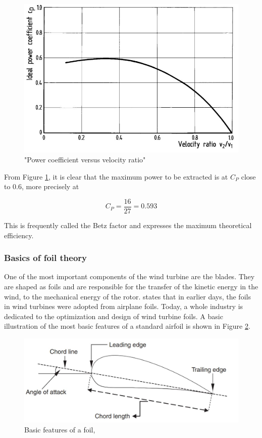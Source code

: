 \begin{figure}[H]
\centering
\includegraphics[scale=0.6]{figures/idealflow}
\caption[$\; \:$Power coefficient versus velocity ratio]{"Power coefficient versus velocity ratio" \cite{Hau2013} }
 \label{fig:idealflow}
\end{figure}

\noindent  From Figure \ref{fig:idealflow}, it is clear that the maximum power to be extracted is at $C_P$ close to 0.6, more precisely at 

 \begin{equation}
    C_P = \frac{16}{27} = 0.593
\end{equation}

\noindent This is frequently called the Betz factor and expresses the maximum theoretical efficiency. 

\subsubsection{Basics of foil theory}
One of the most important components of the wind turbine are the blades. They are shaped as foils and are responsible for the transfer of the kinetic energy in the wind, to the mechanical energy of the rotor. \cite{MATHEW2012} states that in earlier days, the foils in wind turbines were adopted from airplane foils. Today, a whole industry is dedicated to the optimization and design of wind turbine foils. A basic illustration of the most basic features of a standard airfoil is shown in Figure \ref{fig:foil}.  

\begin{figure}[H]
\centering
\includegraphics[scale=0.6]{figures/foil}
\caption[$\; \:$Basic features of a foil]{Basic features of a foil, \cite{MATHEW2012} }
 \label{fig:foil}
\end{figure}

